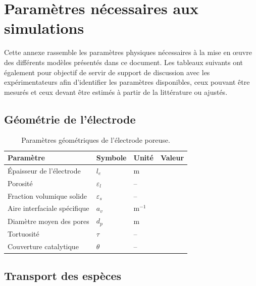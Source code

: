 \section{Paramètres nécessaires aux simulations}

Cette annexe rassemble les paramètres physiques nécessaires à la mise en œuvre des
différents modèles présentés dans ce document. Les tableaux suivants ont également
pour objectif de servir de support de discussion avec les expérimentateurs afin
d'identifier les paramètres disponibles, ceux pouvant être mesurés et ceux devant
être estimés à partir de la littérature ou ajustés.

\subsection{Géométrie de l'électrode}

\begin{table}[H]
\centering
\begin{tabular}{llll}
\hline
Paramètre & Symbole & Unité & Valeur \\
\hline
Épaisseur de l'électrode & $l_e$ & m & \\
Porosité & $\varepsilon_l$ & -- & \\
Fraction volumique solide & $\varepsilon_s$ & -- & \\
Aire interfaciale spécifique & $a_v$ & m$^{-1}$ & \\
Diamètre moyen des pores & $d_p$ & m & \\
Tortuosité & $\tau$ & -- & \\
Couverture catalytique & $\theta$ & -- & \\
\hline
\end{tabular}
\caption{Paramètres géométriques de l'électrode poreuse.}
\end{table}

\subsection{Transport des espèces}

